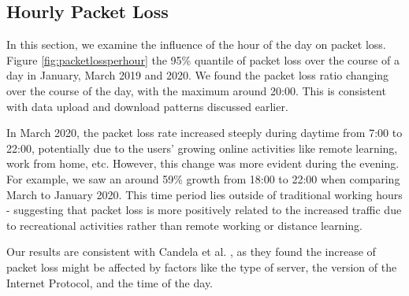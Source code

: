 \subsection{Hourly Packet Loss}

In this section, we examine the influence of the hour of the day on packet loss. Figure \ref{fig:packetlossperhour} the 95\% quantile of packet loss over the course of a day in January, March 2019 and 2020. We found the packet loss ratio changing over the course of the day, with the maximum around 20:00. This is consistent with data upload and download patterns discussed earlier.

In March 2020, the packet loss rate increased steeply during daytime from 7:00 to 22:00, potentially due to the users' growing online activities like remote learning, work from home, etc. However, this change was more evident during the evening. For example, we saw an around 59\% growth from 18:00 to 22:00 when comparing March to January 2020. This time period lies outside of traditional working hours - suggesting that packet loss is more positively related to the increased traffic due to recreational activities rather than remote working or distance learning.

Our results are consistent with Candela et al. \cite{Candela2020latency}, as they found the increase of packet loss might be affected by factors like the type of server, the version of the Internet Protocol, and the time of the day.

